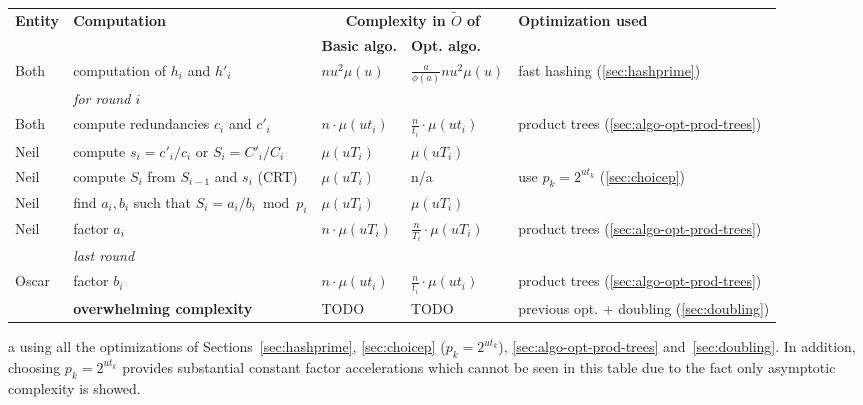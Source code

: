 \documentclass[11pt]{llncs}
\newcommand{\Oapp}{\ensuremath{\tilde{O}}}
\begin{document}
\begin{table}[ht]
 \begin{threeparttable}
  \begin{tabularx}{\textwidth}{lXC{2cm}C{2cm}p{4cm}}
\toprule
{\bf \hfill Entity \hfill \null} & {\bf \hfill Computation \hfill \null} &  \multicolumn{2}{c}{{\bf Complexity in $\Oapp$ of}} & {\bf \hfill Optimization used \hfill \null} \\
\cmidrule(lr){3-4}
& & {\bf Basic algo.} & {\bf Opt. algo.} \\
\midrule
Both  & computation of $h_i$ and $h'_i$ 
      & $n u^2 \mu(u)$ 
      & $\frac{a}{\phi(a)} n u^2 \mu(u)$
      & fast hashing (\ref{sec:hashprime}) \\
\midrule
      & \textit{for round $i$} &  &  \\
Both  & compute redundancies $c_i$ and $c'_i$ 
      & $n \cdot \mu(ut_i)$ 
      & $\frac{n}{t_i} \cdot \mu(ut_i)$
      & product trees (\ref{sec:algo-opt-prod-trees}) \\
Neil  & compute $s_i = c'_i/c_i$ or $S_i = C'_i / C_i$
      & $\mu(uT_i)$
      & $\mu(uT_i)$
      &   \\
Neil  & compute $S_i$ from $S_{i-1}$ and $s_i$ (CRT)
      & $\mu(u T_i)$ 
      & n/a
      & use $p_k = 2^{ut_k}$ (\ref{sec:choicep}) \\
Neil  & find $a_i,b_i$ such that $S_i = a_i/b_i \bmod p_i$
      & $\mu(u T_i)$
      & $\mu(u T_i)$
      & \\
Neil  & factor $a_i$
      & $n \cdot \mu(uT_i)$ 
      & $\frac{n}{T_i} \cdot \mu(uT_i)$
      & product trees (\ref{sec:algo-opt-prod-trees})  \\
\midrule
      & \textit{last round} \\
Oscar & factor $b_i$
      & $n \cdot \mu(ut_i)$ 
      & $\frac{n}{t_i} \cdot \mu(ut_i)$
      & product trees (\ref{sec:algo-opt-prod-trees}) \\
\midrule
      & \textbf{overwhelming complexity}
      & TODO 
      & TODO 
      & previous opt. + doubling (\ref{sec:doubling}) \\
\bottomrule
  \end{tabularx}
  \begin{tablenotes}
    \item[a] using all the optimizations of Sections~\ref{sec:hashprime}, \ref{sec:choicep} ($p_k = 2^{ut_k}$), \ref{sec:algo-opt-prod-trees} and~\ref{sec:doubling}. In addition, choosing $p_k = 2^{ut_k}$ provides substantial constant factor accelerations which cannot be seen in this table due to the fact only asymptotic complexity is showed.

\end{tablenotes}
\end{threeparttable}
\end{table}
\end{document}
